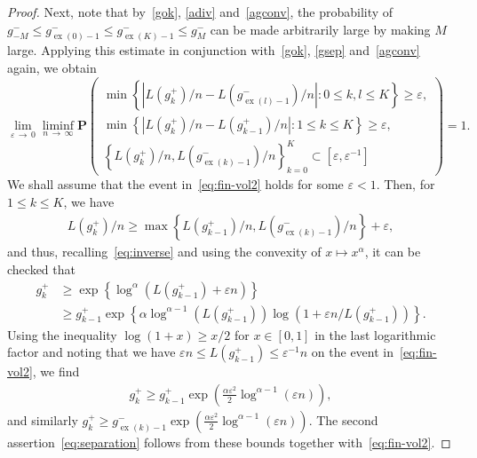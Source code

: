 \documentclass[AHL,Unicode,longabstracts,published]{cedram}
\newcommand{\bfP}{\mathbf{P}}
\renewcommand{\epsilon}{\varepsilon}
\newcommand\ex{\operatorname{ex}}
\newcommand{\gtt}[1]{g_{\ex(#1)-1}^-}
\begin{document}
\begin{proof}
Next, note that by~\eqref{gok}, \eqref{adiv} and~\eqref{agconv}, the probability of $g_{-M}^-\leq \gtt{0} \leq \gtt{K}\leq g_M^-$ can be made arbitrarily large by making $M$ large. Applying this estimate in conjunction with~\eqref{gok}, \eqref{gsep} and~\eqref{agconv} again, we obtain
\begin{equation}\label{eq:fin-vol2}
\lim_{\epsilon\,\to\,0}\liminf_{n\,\to\,\infty} \bfP
\begin{pmatrix}
\min\left\{\left|L\left(g_k^+\right)/n-L(\gtt{l})/n\right|\colon 0\le k,l \le K\right\}\ge \epsilon,\\
\min\left\{\left|L\left(g_k^+\right)/n-L\left(g^+_{k-1}\right)/n\right|\colon 1\le k \le K\right\}\ge \epsilon,\\
\left\{L\left(g_k^+\right)/n, L(\gtt{k})/n\right\}_{k=0}^K \subset \left[\epsilon,\epsilon^{-1}\right]
\end{pmatrix} =1.
\end{equation}
We shall assume that the event in~\eqref{eq:fin-vol2} holds for some $\epsilon <1$. Then, for $1\leq k\leq K$, we have
\begin{align*}
L\left(g_k^+\right)/n \ge \max\left\{L\left(g_{k-1}^+\right)/n, L(\gtt{k})/n\right\} +\epsilon,
\end{align*}
and thus, recalling~\eqref{eq:inverse} and using the convexity of $x\mapsto x^\alpha$, it can be checked that
\begin{align*}
g_k^+& \ge \exp\left\{\log^\alpha \left(L\left(g_{k-1}^+\right)+\epsilon n\right)\right\}\\
&\ge g_{k-1}^+ \exp\left\{\alpha \log^{\alpha-1} \left(L\left(g_{k-1}^+\right)\right) \log\left(1+\epsilon n/L\left(g_{k-1}^+\right)\right)\right\}.
\end{align*}
Using the inequality $\log (1+x) \ge x/2$ for $x\in[0,1]$ in the last logarithmic factor and noting that we have $\epsilon n \le L(g_{k-1}^+)\le \epsilon^{-1}n$ on the event in~\eqref{eq:fin-vol2}, we find
\begin{align*}
g_k^+\ge g_{k-1}^+\exp\left(\tfrac{\alpha \epsilon^2}{2} \log^{\alpha-1} (\varepsilon n)\right),
\end{align*}
and similarly $g_k^+\ge \gtt{k}\exp(\tfrac{\alpha \epsilon^2}{2} \log^{\alpha-1}(\varepsilon n))$. The second assertion~\eqref{eq:separation} follows from these bounds together with~\eqref{eq:fin-vol2}.


\end{proof}
\end{document}
